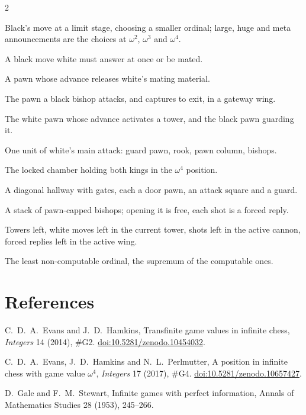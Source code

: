 \documentclass[10pt]{article}
\theoremstyle{notes}
\newcommand{\CK}{\mathrm{CK}}
\begin{document}
\begin{multicols}{2}\footnotesize
\begin{description}[style=unboxed,leftmargin=0pt]
  \item[Announcement] Black's move at a limit stage, choosing a smaller ordinal; large, huge and meta
    announcements are the choices at $\omega^2$, $\omega^3$ and $\omega^4$.
  \item[Forced reply] A black move white must answer at once or be mated.
  \item[Portcullis] A pawn whose advance releases white's mating material.
  \item[Door pawn] The pawn a black bishop attacks, and captures to exit, in a gateway wing.
  \item[Key pawn, lock pawn] The white pawn whose advance activates a tower, and the black pawn guarding it.
  \item[Rook tower] One unit of white's main attack: guard pawn, rook, pawn column, bishops.
  \item[Throne room] The locked chamber holding both kings in the $\omega^4$ position.
  \item[Gateway terminal wing] A diagonal hallway with gates, each a door pawn, an attack square and a guard.
  \item[Bishop cannon] A stack of pawn-capped bishops; opening it is free, each shot is a forced reply.
  \item[$r$, $h$, $b$, $g$] Towers left, white moves left in the current tower, shots left in the active
    cannon, forced replies left in the active wing.
  \item[Church--Kleene ordinal $\omega_1^{\CK}$] The least non-computable ordinal, the supremum of the
    computable ones.
\end{description}
\end{multicols}

\section*{References}

\begin{description}[style=unboxed,leftmargin=0pt]\footnotesize
  \item[{[EH14]}] C.~D.~A.~Evans and J.~D.~Hamkins, Transfinite game values in infinite chess,
    \emph{Integers} 14 (2014), \#G2. \href{https://doi.org/10.5281/zenodo.10454032}{doi:10.5281/zenodo.10454032}.
  \item[{[EHP17]}] C.~D.~A.~Evans, J.~D.~Hamkins and N.~L.~Perlmutter, A position in infinite chess with game
    value $\omega^4$, \emph{Integers} 17 (2017), \#G4. \href{https://doi.org/10.5281/zenodo.10657427}{doi:10.5281/zenodo.10657427}.
  \item[{[GS53]}] D.~Gale and F.~M.~Stewart, Infinite games with perfect information, Annals of Mathematics
    Studies 28 (1953), 245--266.
\end{description}
\end{document}
